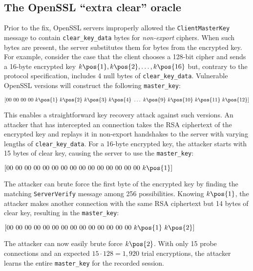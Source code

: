 \subsection{The OpenSSL ``extra clear'' oracle}


\label{sec:clear-key-vuln}

Prior to the fix, OpenSSL servers improperly allowed the \texttt{ClientMasterKey} message to contain
\texttt{clear\_key\_data} bytes for \emph{non-export} ciphers.  When such bytes are present,
the server substitutes them for bytes from the
encrypted key. For example, consider the case that the client chooses a 128-bit cipher and sends a 16-byte
encrypted key $k\pos{1}, k\pos{2}, \ldots, k\pos{16}$ but, contrary to the protocol specification, includes 4
null bytes of \texttt{clear\_key\_data}. Vulnerable OpenSSL versions will
construct the following \texttt{master\_key}:\smallskip

\small\noindent\quad\quad $[00\ 00\ 00\ 00\ k\pos{1}\ k\pos{2}\ k\pos{3}\ k\pos{4}\ \dots\ k\pos{9}\ k\pos{10}\ k\pos{11}\ k\pos{12}]$\normalsize\vspace{-12pt}
\smallskip

This enables a straightforward key recovery attack against such versions.
An attacker that has intercepted an \ssltwo connection takes the RSA
ciphertext of the encrypted key and replays it in non-export handshakes to
the server with varying lengths of \texttt{clear\_key\_data}. For a 16-byte
encrypted key, the attacker starts with 15 bytes of clear key, causing the server to use the \texttt{master\_key}:
\smallskip

\small\noindent\quad\quad $[00\ 00\ 00\ 00\ 00\ 00\ 00\ 00\ 00\ 00\ 00\ 00\ 00\ 00\ 00\ k\pos{1}]$\normalsize
\smallskip

The attacker can brute force the first byte of the encrypted key by
finding the matching \texttt{ServerVerify} message among 256
possibilities. Knowing $k\pos{1}$, the attacker makes another
connection with the same RSA ciphertext but 14 bytes of clear key,
resulting in the \texttt{master\_key}:
\smallskip

\small\noindent\quad\quad $[00\ 00\ 00\ 00\ 00\ 00\ 00\ 00\ 00\ 00\ 00\ 00\ 00\ 00\ k\pos{1}\ k\pos{2}]$\normalsize
\smallskip

The attacker can now easily brute force $k\pos{2}$. With only 15 probe
connections and an expected $15 \cdot 128 = 1,920$
trial encryptions, the attacker learns the entire \texttt{master\_key} for the
recorded session.


